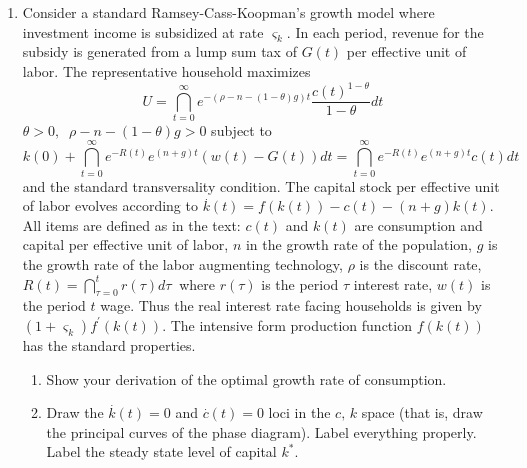 \documentclass{article}
\begin{document}
\begin{enumerate}
\item Consider a standard Ramsey-Cass-Koopman's growth model where
investment income is subsidized at rate $\varsigma _{k}.$ In each period,
revenue for the subsidy is generated from a lump sum tax of $G\left(
t\right) $ per effective unit of labor. The representative household
maximizes 
\begin{equation*}
U=\dint\limits_{t=0}^{\infty }e^{-\left( \rho -n-\left( 1-\theta \right)
g\right) t}\frac{c\left( t\right) ^{1-\theta }}{1-\theta }dt
\end{equation*}%
$\theta >0,$ $\ \rho -n-\left( 1-\theta \right) g>0$ subject to%
\begin{equation*}
k\left( 0\right) +\dint\limits_{t=0}^{\infty }e^{-R\left( t\right)
}e^{\left( n+g\right) t}\left( w\left( t\right) -G\left( t\right) \right)
dt=\dint\limits_{t=0}^{\infty }e^{-R\left( t\right) }e^{\left( n+g\right)
t}c\left( t\right) dt
\end{equation*}%
and the standard transversality condition. The capital stock per effective
unit of labor evolves according to $\overset{.}{k}\left( t\right) =f\left(
k\left( t\right) \right) -c\left( t\right) -\left( n+g\right) k\left(
t\right) .$ All items are defined as in the text: $c\left( t\right) $ and $%
k\left( t\right) $ are consumption and capital per effective unit of labor, $%
n$ in the growth rate of the population, $g$ is the growth rate of the labor
augmenting technology, $\rho $ is the discount rate, $R\left( t\right)
=\dint\limits_{\tau =0}^{t}r\left( \tau \right) d\tau $ $\ $where $r\left(
\tau \right) $ is the period $\tau $ interest rate, $w\left( t\right) $ is
the period $t$ wage. Thus the real interest rate facing households is given
by $\left( 1+\varsigma _{k}\right) f^{\prime }\left( k\left( t\right)
\right) .$ The intensive form production function $f\left( k\left( t\right)
\right) $ has the standard properties.

\begin{enumerate}
\item Show your derivation of the optimal growth rate of consumption.

\item Draw the $\overset{.}{k}\left( t\right) =0$ and $\overset{.}{c}\left(
t\right) =0$ loci in the $c,\,k$ space (that is, draw the principal curves
of the phase diagram). Label everything properly. Label the steady state
level of capital $k^{\ast }.$


\end{enumerate}
\end{enumerate}
\end{document}
